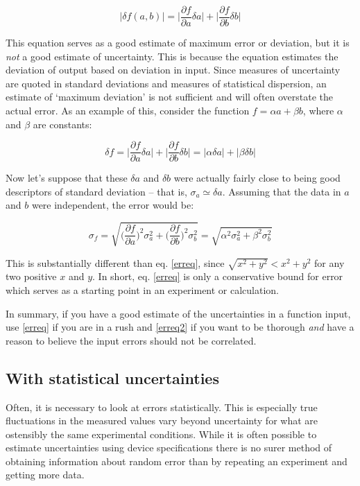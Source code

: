 \begin{equation}
|\delta f(a,b)| = \bigg | \frac{\partial f}{\partial a} \delta a \bigg | + \bigg | \frac{\partial f}{\partial b} \delta b \bigg |
\end{equation}

This equation serves as a good estimate of maximum error or deviation, but it is \emph{not} a good estimate of uncertainty. This is because the equation estimates the deviation of output based on deviation in input. Since measures of uncertainty are quoted in standard deviations and measures of statistical dispersion, an estimate of `maximum deviation' is not sufficient and will often overstate the actual error. As an example of this, consider the function $f = \alpha a + \beta b$, where $\alpha$ and $\beta$ are constants:

\begin{equation}
\delta f = \bigg | \frac{\partial f}{\partial a} \delta a \bigg | + \bigg | \frac{\partial f}{\partial b} \delta b \bigg | = |\alpha \delta a|  + |\beta \delta b|   \label{erreq}
\end{equation}

Now let's suppose that these $\delta a$ and $\delta b$ were actually fairly close to being good descriptors of standard deviation -- that is, $\sigma_a \simeq \delta a$. Assuming that the data in $a$ and $b$ were independent, the error would be:

\begin{equation}
\sigma_f = \sqrt{\bigg (  \frac{\partial f}{\partial a}\bigg )^2 \sigma_a^2 + \bigg (  \frac{\partial f}{\partial b}\bigg )^2 \sigma_b^2} = \sqrt{\alpha^2 \sigma_a^2 + \beta^2 \sigma_b^2} \label{erreq2}
\end{equation}

This is substantially different than eq. \ref{erreq}, since $\sqrt{x^2 + y^2} < x^2 + y^2$ for any two positive $x$ and $y$. In short, eq. \ref{erreq} is only a conservative bound for error which serves as a starting point in an experiment or calculation.

In summary, if you have a good estimate of the uncertainties in a function input, use \eqref{erreq} if you are in a rush and \eqref{erreq2} if you want to be thorough \emph{and} have a reason to believe the input errors should not be correlated.




\subsection{With statistical uncertainties}
Often, it is necessary to look at errors statistically. This is especially true fluctuations in the measured values vary beyond uncertainty for what are ostensibly the same experimental conditions. While it is often possible to estimate uncertainties using device specifications there is no surer method of obtaining information about random error than by repeating an experiment and getting more data.

